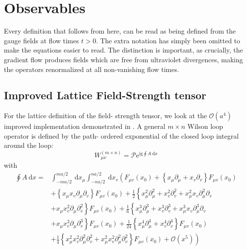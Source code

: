\documentclass[a4paper,10pt]{book}
\begin{document}
\section{Observables}
Every definition that follows from here, can be read as being defined from the gauge fields at flow times $t>0$. The extra notation has simply been omitted to make the equations easier to read. The distinction is important, as crucially, the gradient flow produces fields which are free from ultraviolet divergences, making the operators renormalized at all non-vanishing flow times. 
\subsection{Improved Lattice Field-Strength tensor}\label{sec:improvedLatticeFieldStrengthTensor}
For the lattice definition of the field- strength tensor, we look at the $\mathcal{O}\left(a^{4}\right)$ improved implementation demonstrated in \cite{BILSONTHOMPSON20031}. A general $m\times n$ Wilson loop operator is defined by the path- ordered exponential of the closed loop integral around the loop:
\begin{equation}
W_{\mu \nu}^{(m \times n)}=\mathscr{P} \mathrm{e}^{\mathrm{ig} \oint A \mathrm{~d} x}
\end{equation}
with 
\begin{equation}\label{eq:WilsonLoopExpansionLoopIntegral}
\begin{aligned}
\oint A \mathrm{~d} x=& \int_{-m a / 2}^{m a / 2} \mathrm{~d} x_{\mu} \int_{-n a / 2}^{n a / 2} \mathrm{~d} x_{v}\left(F_{\mu v}\left(x_{0}\right)+\left\{x_{\mu} \partial_{\mu}+x_{v} \partial_{v}\right\} F_{\mu v}\left(x_{0}\right)\right.\\
&+\left\{x_{\mu} x_{v} \partial_{\mu} \partial_{v}\right\} F_{\mu v}\left(x_{0}\right)+\frac{1}{2}\left\{x_{\mu}^{2} \partial_{\mu}^{2}+x_{v}^{2} \partial_{v}^{2}+x_{\mu}^{2} x_{v} \partial_{\mu}^{2} \partial_{v}\right.\\
&\left.+x_{\mu} x_{v}^{2} \partial_{\mu} \partial_{v}^{2}\right\} F_{\mu v}\left(x_{0}\right)+\frac{1}{6}\left\{x_{\mu}^{3} \partial_{\mu}^{3}+x_{v}^{3} \partial_{v}^{3}+x_{\mu}^{3} x_{v} \partial_{\mu}^{3} \partial_{v}\right.\\
&\left.+x_{\mu} x_{v}^{3} \partial_{\mu} \partial_{v}^{3}\right\} F_{\mu v}\left(x_{0}\right)+\frac{1}{24}\left\{x_{\mu}^{4} \partial_{\mu}^{4}+x_{v}^{4} \partial_{v}^{4}\right\} F_{\mu v}\left(x_{0}\right) \\
&\left.+\frac{1}{4}\left\{x_{\mu}^{2} x_{v}^{2} \partial_{\mu}^{2} \partial_{v}^{2}+x_{\mu}^{2} x_{v}^{2} \partial_{\mu}^{2} \partial_{v}^{2}\right\} F_{\mu v}\left(x_{0}\right)+\mathcal{O}\left(x^{5}\right)\right) 
\end{aligned}
\end{equation}
\end{document}
